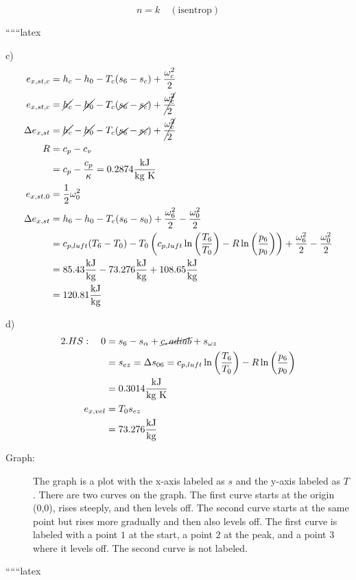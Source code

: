 \[
n = k \quad (\text{isentrop})
\]

``````latex


c)
\begin{align*}
e_{x,st,c} &= h_c - h_0 - T_c(s_6 - s_c) + \frac{\omega_c^2}{2} \\
e_{x,st,c} &= \cancel{h_c} - \cancel{h_0} - T_c(\cancel{s_6} - \cancel{s_c}) + \cancel{\frac{\omega_c^2}{2}} \\
\Delta e_{x,st} &= \cancel{h_c} - \cancel{h_0} - T_c(\cancel{s_6} - \cancel{s_c}) + \cancel{\frac{\omega_c^2}{2}} \\
R &= c_p - c_v \\
&= c_p - \frac{c_p}{\kappa} = 0.2874 \frac{\text{kJ}}{\text{kg K}} \\
e_{x,st,0} &= \frac{1}{2} \omega_0^2 \\
\Delta e_{x,st} &= h_6 - h_0 - T_c(s_6 - s_0) + \frac{\omega_6^2}{2} - \frac{\omega_0^2}{2} \\
&= c_{p,luft}(T_6 - T_0) - T_0 \left( c_{p,luft} \ln \left( \frac{T_6}{T_0} \right) - R \ln \left( \frac{p_6}{p_0} \right) \right) + \frac{\omega_6^2}{2} - \frac{\omega_0^2}{2} \\
&= 85.43 \frac{\text{kJ}}{\text{kg}} - 73.276 \frac{\text{kJ}}{\text{kg}} + 108.65 \frac{\text{kJ}}{\text{kg}} \\
&= 120.81 \frac{\text{kJ}}{\text{kg}}
\end{align*}

d)
\begin{align*}
2. HS: \quad 0 &= s_6 - s_{\alpha} + \cancel{c, adiab} + s_{\omega z} \\
&= s_{e z} = \Delta s_{0 6} = c_{p,luft} \ln \left( \frac{T_6}{T_0} \right) - R \ln \left( \frac{p_6}{p_0} \right) \\
&= 0.3014 \frac{\text{kJ}}{\text{kg K}} \\
e_{x,vel} &= T_0 s_{e z} \\
&= 73.276 \frac{\text{kJ}}{\text{kg}}
\end{align*}

\begin{description}
\item[Graph:] The graph is a plot with the x-axis labeled as $s$ and the y-axis labeled as $T$. There are two curves on the graph. The first curve starts at the origin (0,0), rises steeply, and then levels off. The second curve starts at the same point but rises more gradually and then also levels off. The first curve is labeled with a point $1$ at the start, a point $2$ at the peak, and a point $3$ where it levels off. The second curve is not labeled.
\end{description}

``````latex


